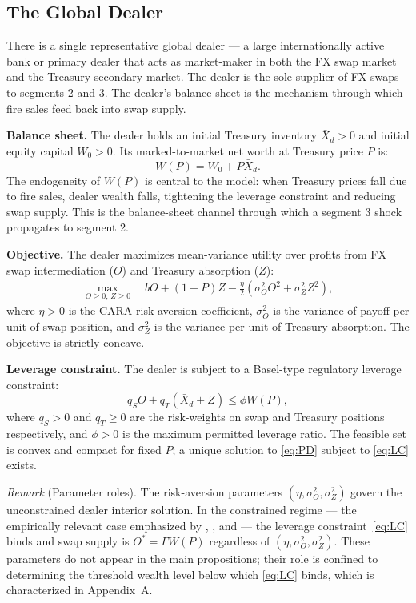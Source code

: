 \subsection{The Global Dealer}
\label{subsec:dealer}

There is a single representative global dealer — a large internationally active bank or primary
dealer that acts as market-maker in both the FX swap market and the Treasury secondary market.
The dealer is the sole supplier of FX swaps to segments 2 and 3. The dealer's balance sheet is
the mechanism through which fire sales feed back into swap supply.

\textbf{Balance sheet.} The dealer holds an initial Treasury inventory $\bar{X}_d > 0$ and initial
equity capital $W_0 > 0$. Its marked-to-market net worth at Treasury price $P$ is:
\begin{equation}
  W(P) = W_0 + P\bar{X}_d.
  \label{eq:wealth}
\end{equation}
The endogeneity of $W(P)$ is central to the model: when Treasury prices fall due to fire sales,
dealer wealth falls, tightening the leverage constraint and reducing swap supply. This is the
balance-sheet channel through which a segment 3 shock propagates to segment 2.

\textbf{Objective.} The dealer maximizes mean-variance utility over profits from FX swap
intermediation ($O$) and Treasury absorption ($Z$):
\begin{align}
  \max_{O \geq 0,\, Z \geq 0} \quad bO + (1-P)Z - \frac{\eta}{2}\!\left(\sigma_O^2 O^2 + \sigma_Z^2 Z^2\right),
  \tag{P-D}
  \label{eq:PD}
\end{align}
where $\eta > 0$ is the CARA risk-aversion coefficient, $\sigma_O^2$ is the variance of payoff per
unit of swap position, and $\sigma_Z^2$ is the variance per unit of Treasury absorption. The objective
is strictly concave.

\textbf{Leverage constraint.} The dealer is subject to a Basel-type regulatory leverage constraint:
\begin{equation}
  q_S O + q_T(\bar{X}_d + Z) \leq \phi W(P),
  \tag{LC}
  \label{eq:LC}
\end{equation}
where $q_S > 0$ and $q_T \geq 0$ are the risk-weights on swap and Treasury positions respectively,
and $\phi > 0$ is the maximum permitted leverage ratio. The feasible set is convex and compact for
fixed $P$; a unique solution to \eqref{eq:PD} subject to \eqref{eq:LC} exists.

\textit{Remark} (Parameter roles). The risk-aversion parameters $(\eta, \sigma_O^2, \sigma_Z^2)$
govern the unconstrained dealer interior solution. In the constrained regime — the empirically
relevant case emphasized by \citet{Duffie2020}, \citet{DuTepperVerdelhan2018}, and
\citet{GabaixMaggori2015} — the leverage constraint~\eqref{eq:LC} binds and swap supply is
$O^* = \Gamma W(P)$ regardless of $(\eta, \sigma_O^2, \sigma_Z^2)$. These parameters do not
appear in the main propositions; their role is confined to determining the threshold wealth level
below which \eqref{eq:LC} binds, which is characterized in Appendix~A.

